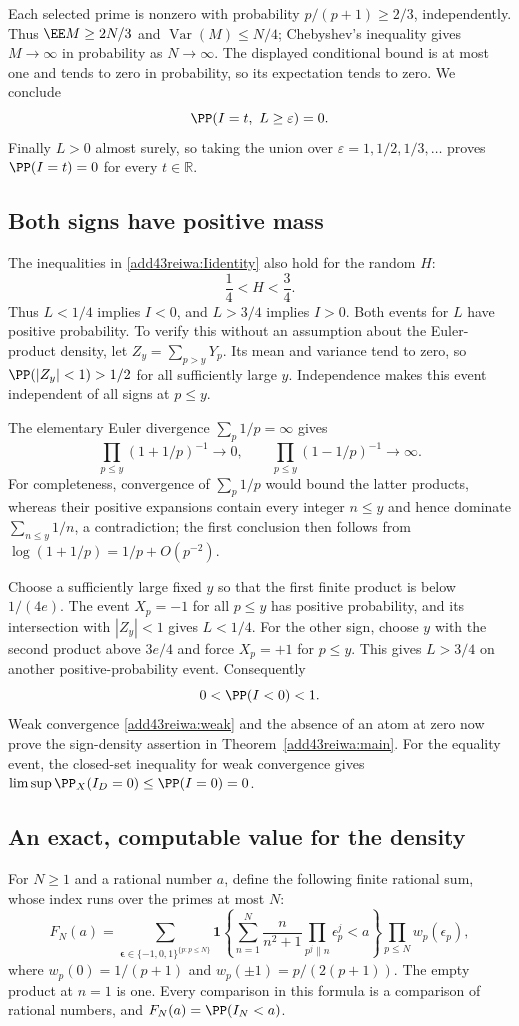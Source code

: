 \documentclass[11pt,a4paper]{article}
\numberwithin{equation}{section}
\theoremstyle{definition}
\theoremstyle{remark}
\begin{document}
Each selected prime is nonzero with probability $p/(p+1)\ge2/3$,
independently. Thus $\EE M\ge2N/3$ and
$\operatorname{Var}(M)\le N/4$; Chebyshev's inequality gives
$M\to\infty$ in probability as $N\to\infty$. The displayed
conditional bound is at most one and tends to zero in probability,
so its expectation tends to zero. We conclude
\[
                   \PP(I=t,\ L\ge\varepsilon)=0.
\]
Finally $L>0$ almost surely, so taking the union over
$\varepsilon=1,1/2,1/3,\ldots$ proves $\PP(I=t)=0$ for every
$t\in\mathbb R$.

\subsection{Both signs have positive mass}
The inequalities in \eqref{add43reiwa:Iidentity} also hold for the random $H$:
\[
                         \frac14<H<\frac34.
\]
Thus $L<1/4$ implies $I<0$, and $L>3/4$ implies $I>0$.
Both events for $L$ have positive probability. To verify this without
an assumption about the Euler-product density, let
$Z_y=\sum_{p>y}Y_p$. Its mean and variance tend to zero, so
$\PP(|Z_y|<1)>1/2$ for all sufficiently large $y$.
Independence makes this event independent of all signs at $p\le y$.

The elementary Euler divergence $\sum_p1/p=\infty$ gives
\[
 \prod_{p\le y}(1+1/p)^{-1}\longrightarrow0,
 \qquad
 \prod_{p\le y}(1-1/p)^{-1}\longrightarrow\infty.
\]
For completeness, convergence of $\sum_p1/p$ would bound the latter
products, whereas their positive expansions contain every integer
$n\le y$ and hence dominate $\sum_{n\le y}1/n$, a contradiction;
the first conclusion then follows from
$\log(1+1/p)=1/p+O(p^{-2})$.

Choose a sufficiently large fixed $y$ so that the first finite
product is below $1/(4e)$. The event $X_p=-1$ for all $p\le y$
has positive probability, and its intersection with $|Z_y|<1$ gives
$L<1/4$. For the other sign, choose $y$ with the second product
above $3e/4$ and force $X_p=+1$ for $p\le y$. This gives $L>3/4$
on another positive-probability event. Consequently
\[
                            0<\PP(I<0)<1.
\]
Weak convergence \eqref{add43reiwa:weak} and the absence of an atom at zero
now prove the sign-density assertion in Theorem~\ref{add43reiwa:main}.
For the equality event, the closed-set inequality for weak convergence
gives $\limsup\PP_X(I_D=0)\le\PP(I=0)=0$.

\subsection{An exact, computable value for the density}
For $N\ge1$ and a rational number $a$, define the following finite
rational sum, whose index runs over the primes at most $N$:
\begin{equation}\label{add43reiwa:finiteformula}
 F_N(a)=
 \sum_{\boldsymbol\epsilon\in\{-1,0,1\}^{\{p:p\le N\}}}
 \mathbf1\left\{
   \sum_{n=1}^N\frac{n}{n^2+1}
       \prod_{p^j\parallel n}\epsilon_p^j<a\right\}
 \prod_{p\le N}w_p(\epsilon_p),
\end{equation}
where $w_p(0)=1/(p+1)$ and $w_p(\pm1)=p/(2(p+1))$.
The empty product at $n=1$ is one. Every comparison in this formula
is a comparison of rational numbers, and $F_N(a)=\PP(I_N<a)$.
\end{document}
